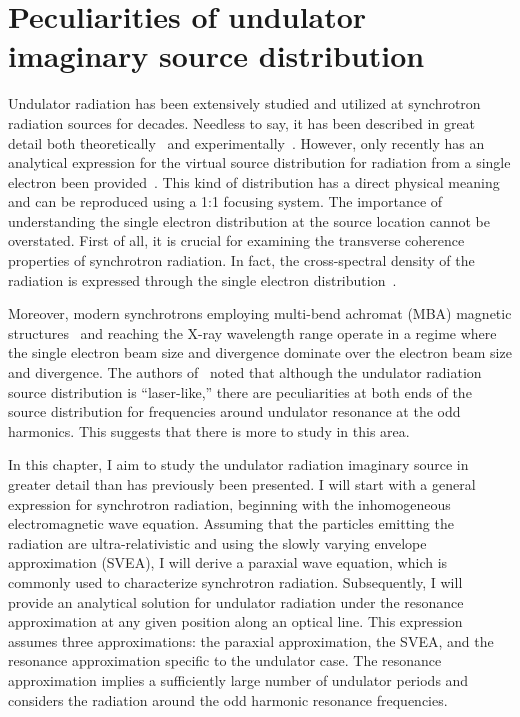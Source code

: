 \chapter{Peculiarities of undulator imaginary source distribution}
\label{Chapter:Undulator radiation imaginary source peculiarities}

    
    Undulator radiation has been extensively studied and utilized at synchrotron radiation sources for decades. Needless to say, it has been described in great detail both theoretically~\cite{theoretical_reference} and experimentally~\cite{experimental_reference}. However, only recently has an analytical expression for the virtual source distribution for radiation from a single electron been provided~\cite{geloni_statistical_2006, geloni_fourier_2007}. This kind of distribution has a direct physical meaning and can be reproduced using a 1:1 focusing system. The importance of understanding the single electron distribution at the source location cannot be overstated. First of all, it is crucial for examining the transverse coherence properties of synchrotron radiation. In fact, the cross-spectral density of the radiation is expressed through the single electron distribution~\cite{geloni_transverse_2008}.
    
    Moreover, modern synchrotrons employing multi-bend achromat (MBA) magnetic structures~\cite{mba_reference} and reaching the X-ray wavelength range operate in a regime where the single electron beam size and divergence dominate over the electron beam size and divergence. The authors of~\cite{geloni_fourier_2007} noted that although the undulator radiation source distribution is “laser-like,” there are peculiarities at both ends of the source distribution for frequencies around undulator resonance at the odd harmonics. This suggests that there is more to study in this area.
    
    In this chapter, I aim to study the undulator radiation imaginary source in greater detail than has previously been presented. I will start with a general expression for synchrotron radiation, beginning with the inhomogeneous electromagnetic wave equation. Assuming that the particles emitting the radiation are ultra-relativistic and using the slowly varying envelope approximation (SVEA), I will derive a paraxial wave equation, which is commonly used to characterize synchrotron radiation. Subsequently, I will provide an analytical solution for undulator radiation under the resonance approximation at any given position along an optical line. This expression assumes three approximations: the paraxial approximation, the SVEA, and the resonance approximation specific to the undulator case. The resonance approximation implies a sufficiently large number of undulator periods and considers the radiation around the odd harmonic resonance frequencies.
    
